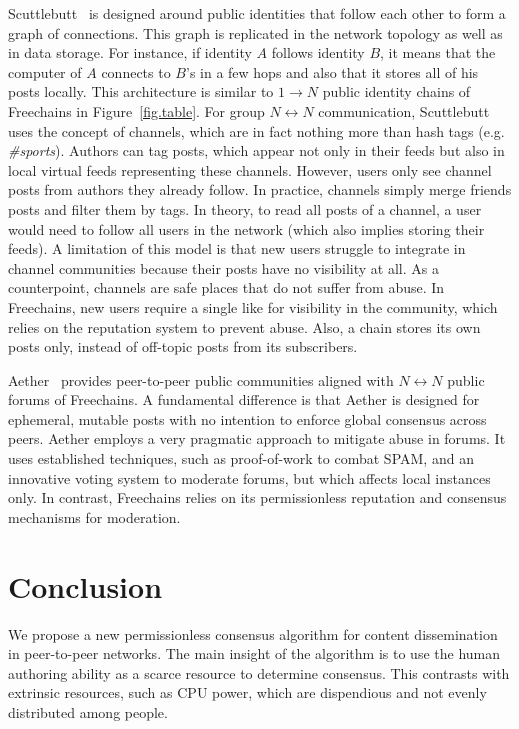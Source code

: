 \documentclass[10pt,journal,compsoc]{IEEEtran}
\newcommand{\FC}       {Freechains\xspace}
\newcommand{\Xon} {$1{\rightarrow}N$\xspace}
\newcommand{\Xnn} {$N{\leftrightarrow}N$\xspace}
\begin{document}
Scuttlebutt~\cite{p2p.scuttlebutt} is designed around public identities that
follow each other to form a graph of connections.
This graph is replicated in the network topology as well as in data storage.
For instance, if identity $A$ follows identity $B$, it means that the computer
of $A$ connects to $B$'s in a few hops and also that it stores all of his posts
locally.
This architecture is similar to \Xon public identity chains of \FC in
Figure~\ref{fig.table}.
%
For group \Xnn communication, Scuttlebutt uses the concept of channels, which
are in fact nothing more than hash tags (e.g. \emph{\#sports}).
Authors can tag posts, which appear not only in their feeds but also in local
virtual feeds representing these channels.
However, users only see channel posts from authors they already follow.
In practice, channels simply merge friends posts and filter them by tags.
In theory, to read all posts of a channel, a user would need to follow all
users in the network (which also implies storing their feeds).
A limitation of this model is that new users struggle to integrate in channel
communities because their posts have no visibility at all.
As a counterpoint, channels are safe places that do not suffer from abuse.
%
In \FC, new users require a single like for visibility in the community, which
relies on the reputation system to prevent abuse.
Also, a chain stores its own posts only, instead of off-topic posts from its
subscribers.

Aether~\cite{p2p.ecosystem} provides peer-to-peer public communities aligned
with \Xnn public forums of \FC.
A fundamental difference is that Aether is designed for ephemeral, mutable
posts with no intention to enforce global consensus across peers.
Aether employs a very pragmatic approach to mitigate abuse in forums.
It uses established techniques, such as proof-of-work to combat SPAM, and an
innovative voting system to moderate forums, but which affects local instances
only.
In contrast, \FC relies on its permissionless reputation and consensus
mechanisms for moderation.

\section{Conclusion}
\label{sec.conclusion}

We propose a new permissionless consensus algorithm for content dissemination
in peer-to-peer networks.
The main insight of the algorithm is to use the human authoring ability as a
scarce resource to determine consensus.
This contrasts with extrinsic resources, such as CPU power, which are
dispendious and not evenly distributed among people.%
\end{document}

